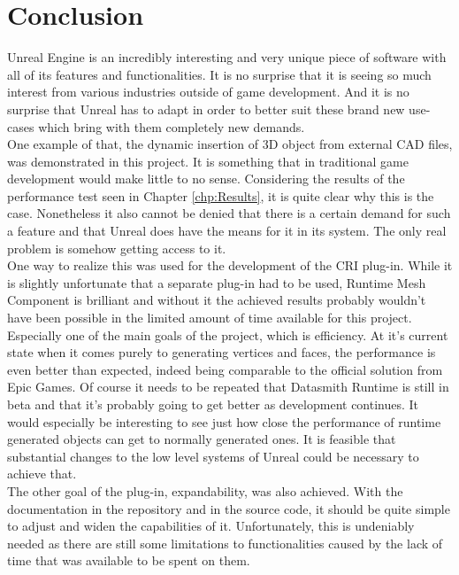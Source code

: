 \chapter{Conclusion}\label{chp:Conclusion}

Unreal Engine is an incredibly interesting and very unique piece of software with all of its features and functionalities. It is no surprise that it is seeing so much interest from various industries outside of game development. And it is no surprise that Unreal has to adapt in order to better suit these brand new use-cases which bring with them completely new demands.\\
One example of that, the dynamic insertion of 3D object from external CAD files, was demonstrated in this project. It is something that in traditional game development would make little to no sense. Considering the results of the performance test seen in Chapter \ref{chp:Results}, it is quite clear why this is the case. Nonetheless it also cannot be denied that there is a certain demand for such a feature and that Unreal does have the means for it in its system. The only real problem is somehow getting access to it.\\
One way to realize this was used for the development of the \acs{CRI} plug-in. While it is slightly unfortunate that a separate plug-in had to be used, Runtime Mesh Component is brilliant and without it the achieved results probably wouldn't have been possible in the limited amount of time available for this project. Especially one of the main goals of the project, which is efficiency. At it's current state when it comes purely to generating vertices and faces, the performance is even better than expected, indeed being comparable to the official solution from Epic Games. Of course it needs to be repeated that Datasmith Runtime is still in beta and that it's probably going to get better as development continues. It would especially be interesting to see just how close the performance of runtime generated objects can get to normally generated ones. It is feasible that substantial changes to the low level systems of Unreal could be necessary to achieve that.\\
The other goal of the plug-in, expandability, was also achieved. With the documentation in the repository and in the source code, it should be quite simple to adjust and widen the capabilities of it. Unfortunately, this is undeniably needed as there are still some limitations to functionalities caused by the lack of time that was available to be spent on them.\\
